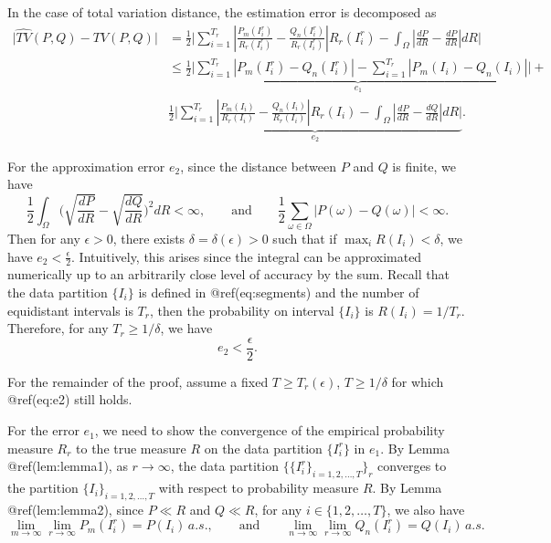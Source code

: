 \documentclass{article}
\begin{document}
In the case of total variation distance, the estimation error is
decomposed as \begin{equation}\label{eq:tvderrors}
\begin{aligned}
\bigg|\hat{TV}(P , Q) - TV(P , Q) \bigg| &= \frac{1}{2} \bigg| \sum_{i=1}^{T_r} \left| \frac{P_m(I_i^r)}{R_r(I_i^r)} - \frac{Q_n(I_i^r)}{R_r(I_i^r)} \right| R_r(I_i^r) - \int_{\Omega} \left|\frac{dP}{dR} - \frac{dP}{dR}\right|dR \bigg| \\
&\leq \underbrace{\frac{1}{2} \bigg|\sum_{i=1}^{T_r} | P_m(I_i^r) - Q_n(I_i^r) | -
 \sum_{i=1}^{T_r} |P_m(I_i) - Q_n(I_i)| \bigg|}_{e_1} + \\
& \underbrace{\frac{1}{2} \bigg|  \sum_{i=1}^{T_r} \left|\frac{P_m(I_i)}{R_r(I_i)} - \frac{Q_n(I_i)}{R_r(I_i)}\right|R_r(I_i) - \int_{\Omega} \left|\frac{dP}{dR} - \frac{dQ}{dR}\right|dR \bigg|}_{e_2}.
\end{aligned}
\end{equation}

For the approximation error \(e_2\), since the distance between \(P\)
and \(Q\) is finite, we have \begin{equation}
  \frac{1}{2} \int_\Omega \bigg(\sqrt{\frac{dP}{dR}} - \sqrt{\frac{dQ}{dR}} \bigg)^2 dR < \infty,
  \qquad\text{and} \qquad
  \frac{1}{2} \sum_{\omega \in \Omega} \bigg|P(\omega) - Q(\omega)\bigg| < \infty.
\end{equation} Then for any \(\epsilon > 0\), there exists
\(\delta = \delta(\epsilon) > 0\) such that if
\(\max_i{R(I_i)} < \delta\), we have \(e_2 < \frac{\epsilon}{2}\).
Intuitively, this arises since the integral can be approximated
numerically up to an arbitrarily close level of accuracy by the sum.
Recall that the data partition \(\{I_i\}\) is defined in
@ref(eq:segments) and the number of equidistant intervals is \(T_r\),
then the probability on interval \(\{I_i\}\) is \(R(I_i) = 1/T_r\).
Therefore, for any \(T_r \geq 1 / \delta\), we have
\begin{equation}\label{eq:e2}
e_2 < \frac{\epsilon}{2}.
\end{equation}

For the remainder of the proof, assume a fixed \(T \geq T_r(\epsilon)\),
\(T \geq 1 / \delta\) for which @ref(eq:e2) still holds.

For the error \(e_1\), we need to show the convergence of the empirical
probability measure \(R_r\) to the true measure \(R\) on the data
partition \(\{I_i^r\}\) in \(e_1\). By Lemma @ref(lem:lemma1), as
\(r \rightarrow \infty\), the data partition
\(\{\{I_i^r\}_{i = 1,2, \dots, T} \}_r\) converges to the partition
\(\{I_i\}_{i = 1,2, \dots, T}\) with respect to probability measure
\(R\). By Lemma @ref(lem:lemma2), since \(P \ll R\) and \(Q \ll R\), for
any \(i \in \{1,2,\dots,T\}\), we also have \begin{equation}
  \lim_{m \rightarrow \infty}\lim_{r \rightarrow \infty} P_m(I_i^r) = P(I_i)\, a.s. ,
  \qquad \text{and} \qquad
  \lim_{n \rightarrow \infty}\lim_{r \rightarrow \infty} Q_n(I_i^r) = Q(I_i)\, a.s.\label{eq:asconv}
\end{equation}
\end{document}
